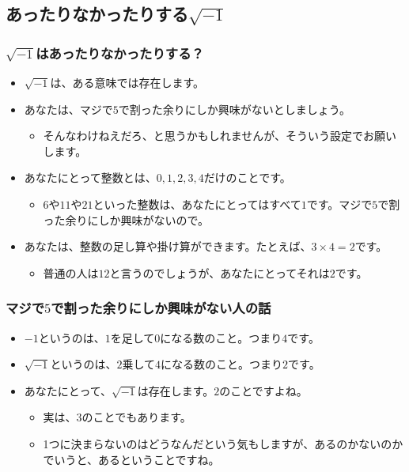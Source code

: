 \documentclass[dvipdfmx]{beamer}
\begin{document}
  \subsection{あったりなかったりする$\sqrt{-1}$}

  \begin{frame}
    \frametitle{$\sqrt{-1}$はあったりなかったりする？}

    \begin{itemize}
      \item $\sqrt{-1}$は、ある意味では存在します。
      \item あなたは、マジで$5$で割った余りにしか興味がないとしましょう。
      \begin{itemize}
        \item そんなわけねえだろ、と思うかもしれませんが、そういう設定でお願いします。
      \end{itemize}
      \item あなたにとって整数とは、$0, 1, 2, 3, 4$だけのことです。
      \begin{itemize}
        \item $6$や$11$や$21$といった整数は、あなたにとってはすべて$1$です。マジで$5$で割った余りにしか興味がないので。
      \end{itemize}
      \item あなたは、整数の足し算や掛け算ができます。たとえば、$3 \times 4 = 2$です。
      \begin{itemize}
        \item 普通の人は$12$と言うのでしょうが、あなたにとってそれは$2$です。
      \end{itemize}
    \end{itemize}

  \end{frame}

  \begin{frame}
    \frametitle{マジで$5$で割った余りにしか興味がない人の話}

    \begin{itemize}
      \item $-1$というのは、$1$を足して$0$になる数のこと。つまり$4$です。
      \item $\sqrt{-1}$というのは、$2$乗して$4$になる数のこと。つまり$2$です。
      \item あなたにとって、$\sqrt{-1}$は存在します。$2$のことですよね。
      \begin{itemize}
        \item 実は、$3$のことでもあります。
        \item 1つに決まらないのはどうなんだという気もしますが、あるのかないのかでいうと、あるということですね。
      \end{itemize}
    \end{itemize}

  \end{frame}
\end{document}
